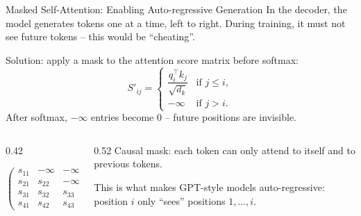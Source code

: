 \documentclass[aspectratio=169]{beamer}
\begin{document}
%
%
\begin{frame}{Masked Self-Attention: Enabling Auto-regressive Generation}
  In the decoder, the model generates tokens one at a time, left to right.  During
  training, it must not see future tokens – this would be ``cheating''.

  \vspace{0.3em}
  Solution: apply a mask to the attention score matrix before softmax:
  \[
    S'_{ij} =
    \begin{cases}
      \dfrac{q_i^\top k_j}{\sqrt{d_k}} & \text{if } j \le i,\\[6pt]
      -\infty & \text{if } j > i.
    \end{cases}
  \]
  After softmax, $-\infty$ entries become 0 – future positions are invisible.

  \vspace{0.3em}
  \begin{columns}[c]
    \begin{column}{0.42\textwidth}
      \begin{center}
      \small$
      \begin{pmatrix}
        s_{11} & -\infty & -\infty & -\infty \\
        s_{21} & s_{22}  & -\infty & -\infty \\
        s_{31} & s_{32}  & s_{33}  & -\infty \\
        s_{41} & s_{42}  & s_{43}  & s_{44}
      \end{pmatrix}
      $
      \end{center}
    \end{column}
    \begin{column}{0.52\textwidth}
      Causal mask: each token can only attend to itself and to previous tokens.

      \vspace{0.3em}
      This is what makes GPT-style models auto-regressive: position $i$ only ``sees''
      positions $1, \ldots, i$.
    \end{column}
  \end{columns}
\end{frame}
%
%
\end{document}
